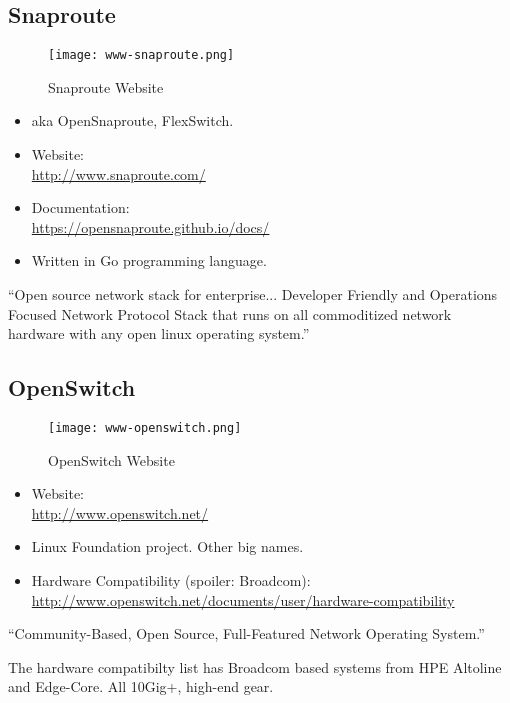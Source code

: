 \subsection{Snaproute}
\begin{figure}[h!]
\texttt{[image: www-snaproute.png]}
 \caption{Snaproute Website}
 \label{fig:www-snaproute}
\end{figure}


\begin{itemize}
 \item aka OpenSnaproute, FlexSwitch.
 \item Website: \\ \url{http://www.snaproute.com/}
 \item Documentation: \\ \url{https://opensnaproute.github.io/docs/}
 \item Written in Go programming language.
\end{itemize}


``Open source network stack for enterprise...
Developer Friendly and Operations Focused Network Protocol Stack that runs on
all commoditized network hardware with any open linux operating system.''


\subsection{OpenSwitch}
\begin{figure}[h!]
\texttt{[image: www-openswitch.png]}
 \caption{OpenSwitch Website}
 \label{fig:www-openswitch}
\end{figure}


\begin{itemize}
 \item Website: \\ \url{http://www.openswitch.net/}
 \item Linux Foundation project. Other big names.
 \item Hardware Compatibility (spoiler: Broadcom): \\ \url{http://www.openswitch.net/documents/user/hardware-compatibility}
\end{itemize}


``Community-Based, Open Source, Full-Featured Network Operating System.''


The hardware compatibilty list has Broadcom based systems from HPE Altoline
and Edge-Core. All 10Gig+, high-end gear.


